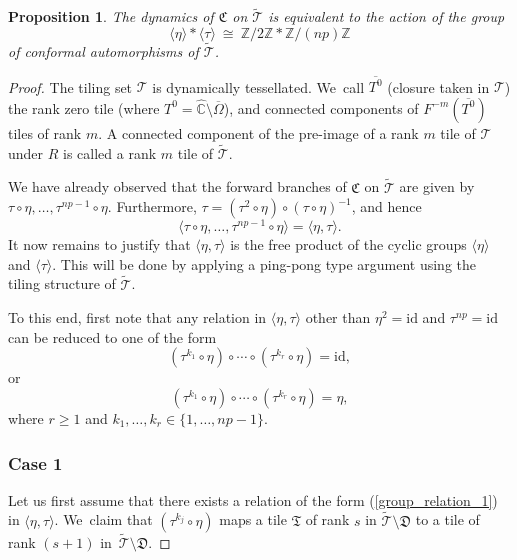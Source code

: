 \documentclass[JEP,XML,SOM,Unicode,NoFloatCountersInSection,published]{cedram}
\newtheorem{proposition}[lemma]{Proposition}
\theoremstyle{definition}
\theoremstyle{remark}
\newcommand{\C}{\mathbb{C}}
\newcommand{\Z}{\mathbb{Z}}
\newcommand{\cT}{\mathcal{T}}
\begin{document}
\begin{proposition}\label{grand_orbit_group_prop}
The dynamics of $\mathfrak{C}$ on $\widetilde{\cT}$ is equivalent to the action of the group
\[
\langle\eta\rangle\ast\langle\tau\rangle\ \cong\ \Z/2\Z\ast\Z/(np)\Z
\]
of conformal automorphisms of $\widetilde{\cT}$.
\end{proposition}
\begin{proof}
The tiling set $\mathcal{T}$ is dynamically tessellated. We~call $\overline{T^0}$ (closure taken in $\mathcal{T}$) the rank zero tile (where $T^0=\widehat{\C}\setminus\overline{\Omega}$), and connected components of $F^{-m}(\overline{T^0})$ tiles of rank $m$. A connected component of the pre-image of a rank $m$ tile of $\mathcal{T}$ under $R$ is called a rank $m$ tile of $\widetilde{\mathcal{T}}$.

We have already observed that the forward branches of $\mathfrak{C}$ on $\widetilde{\mathcal{T}}$ are given by \hbox{$\tau\circ\eta,\dots,\tau^{np-1}\circ\eta$}. Furthermore, $\tau=(\tau^{2}\circ\eta)\circ(\tau\circ\eta)^{-1}$, and hence
\[
\langle\tau\circ\eta,\dots,\tau^{np-1}\circ\eta\rangle=\langle\eta,\tau\rangle.
\]
It now remains to justify that $\langle\eta,\tau\rangle$ is the free product of the cyclic groups $\langle\eta\rangle$ and $\langle\tau\rangle$. This will be done by applying a ping-pong type argument using the tiling structure of $\widetilde{\cT}$.

To this end, first note that any relation in $\langle\eta,\tau\rangle$ other than $\eta^{2}=\mathrm{id}$ and $\tau^{np}=\mathrm{id}$ can be reduced to one of the form
\begin{equation}
(\tau^{k_1}\circ\eta)\circ\cdots\circ(\tau^{k_r}\circ\eta)=\mathrm{id},
\label{group_relation_1}
\end{equation}
or
\begin{equation}
(\tau^{k_1}\circ\eta)\circ\cdots\circ(\tau^{k_r}\circ\eta)=\eta,
\label{group_relation_2}
\end{equation}
where $r\geq 1$ and $k_1,\dots,k_r\in\{1,\dots,np-1\}$.

\subsubsection*{Case 1}
Let us first assume that there exists a relation of the form (\ref{group_relation_1}) in $\langle\eta,\tau\rangle$. We~claim that $(\tau^{k_j}\circ\eta)$ maps a tile $\mathfrak{T}$ of rank $s$ in $\widetilde{\mathcal{T}}\setminus \mathfrak{D}$ to a tile of rank $(s+1)$ in~$\widetilde{\mathcal{T}}\setminus \mathfrak{D}$.


\end{proof}
\end{document}
